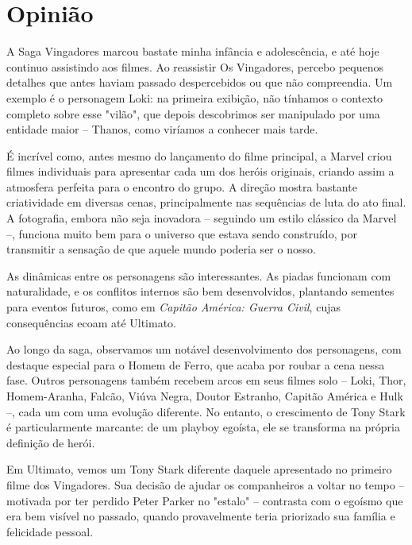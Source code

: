 \documentclass[
    12pt,                  %
    openright,             %
    oneside,               %
    a4paper,               %
    chapter=TITLE,         %
    section=TITLE,         %
    brazil                 %
]{abntex2}                 %
\begin{document}
\section{Opinião}
A Saga Vingadores marcou bastate minha infância e adolescência, e até hoje continuo assistindo aos filmes. Ao reassistir Os Vingadores, percebo pequenos detalhes que antes haviam passado despercebidos ou que não compreendia. Um exemplo é o personagem Loki: na primeira exibição, não tínhamos o contexto completo sobre esse "vilão", que depois descobrimos ser manipulado por uma entidade maior – Thanos, como viríamos a conhecer mais tarde.\\ \vspace{0.1px}

\noindent É incrível como, antes mesmo do lançamento do filme principal, a Marvel criou filmes individuais para apresentar cada um dos heróis originais, criando assim a atmosfera perfeita para o encontro do grupo. A direção mostra bastante criatividade em diversas cenas, principalmente nas sequências de luta do ato final. A fotografia, embora não seja inovadora – seguindo um estilo clássico da Marvel –, funciona muito bem para o universo que estava sendo construído, por transmitir a sensação de que aquele mundo poderia ser o nosso. \\ \vspace{0.1px}

\noindent As dinâmicas entre os personagens são interessantes. As piadas funcionam com naturalidade, e os conflitos internos são bem desenvolvidos, plantando sementes para eventos futuros, como em \textit{Capitão América: Guerra Civil}, cujas consequências ecoam até Ultimato.\\ \vspace{0.1px}

\noindent Ao longo da saga, observamos um notável desenvolvimento dos personagens, com destaque especial para o Homem de Ferro, que acaba por roubar a cena nessa fase. Outros personagens também recebem arcos em seus filmes solo – Loki, Thor, Homem-Aranha, Falcão, Viúva Negra, Doutor Estranho, Capitão América e Hulk –, cada um com uma evolução diferente. No entanto, o crescimento de Tony Stark é particularmente marcante: de um playboy egoísta, ele se transforma na própria definição de herói.\\ \vspace{0.1px}

\noindent Em Ultimato, vemos um Tony Stark diferente daquele apresentado no primeiro filme dos Vingadores. Sua decisão de ajudar os companheiros a voltar no tempo – motivada por ter perdido Peter Parker no "estalo" – contrasta com o egoísmo que era bem visível no passado, quando provavelmente teria priorizado sua família e felicidade pessoal.\\ \vspace{0.1px}
\end{document}
